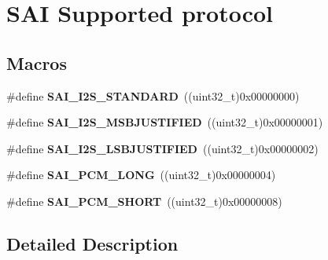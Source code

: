 \hypertarget{group___s_a_i___protocol}{}\section{S\+AI Supported protocol}
\label{group___s_a_i___protocol}
\subsection*{Macros}
\begin{DoxyCompactItemize}
\item 
\#define {\bfseries S\+A\+I\+\_\+\+I2\+S\+\_\+\+S\+T\+A\+N\+D\+A\+RD}~((uint32\+\_\+t)0x00000000)\hypertarget{group___s_a_i___protocol_gae5b5fe45790e5284b86811bacecc6cc4}{}\label{group___s_a_i___protocol_gae5b5fe45790e5284b86811bacecc6cc4}

\item 
\#define {\bfseries S\+A\+I\+\_\+\+I2\+S\+\_\+\+M\+S\+B\+J\+U\+S\+T\+I\+F\+I\+ED}~((uint32\+\_\+t)0x00000001)\hypertarget{group___s_a_i___protocol_ga9c27f6cd9baa30f10aa60d5801ec56e2}{}\label{group___s_a_i___protocol_ga9c27f6cd9baa30f10aa60d5801ec56e2}

\item 
\#define {\bfseries S\+A\+I\+\_\+\+I2\+S\+\_\+\+L\+S\+B\+J\+U\+S\+T\+I\+F\+I\+ED}~((uint32\+\_\+t)0x00000002)\hypertarget{group___s_a_i___protocol_ga297577edf8616a10ea6105868d68d6e6}{}\label{group___s_a_i___protocol_ga297577edf8616a10ea6105868d68d6e6}

\item 
\#define {\bfseries S\+A\+I\+\_\+\+P\+C\+M\+\_\+\+L\+O\+NG}~((uint32\+\_\+t)0x00000004)\hypertarget{group___s_a_i___protocol_gabdeddd81ce3e0d00935aa92eee10fb00}{}\label{group___s_a_i___protocol_gabdeddd81ce3e0d00935aa92eee10fb00}

\item 
\#define {\bfseries S\+A\+I\+\_\+\+P\+C\+M\+\_\+\+S\+H\+O\+RT}~((uint32\+\_\+t)0x00000008)\hypertarget{group___s_a_i___protocol_ga55bc81c09a96dc23280179dff48ea8b4}{}\label{group___s_a_i___protocol_ga55bc81c09a96dc23280179dff48ea8b4}

\end{DoxyCompactItemize}


\subsection{Detailed Description}
